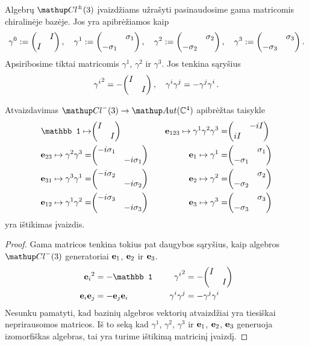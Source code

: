 Algebrų $\Clpm$ įvaizdžiams užrašyti pasinaudosime
gama matricomis chiralinėje bazėje. Jos yra apibrėžiamos kaip
\begin{equation}
	\gamma^0 := \mqty(\admat{I,I}) 			\,,\quad
	\gamma^1 := \mqty(\admat{\sigma_1,-\sigma_1})	\,,\quad
	\gamma^2 := \mqty(\admat{\sigma_2,-\sigma_2})	\,,\quad
	\gamma^3 := \mqty(\admat{\sigma_3,-\sigma_3})	\,.
\end{equation}
Apsiribosime tiktai matricomis $\gamma^1$, $\gamma^2$ ir $\gamma^3$.
Jos tenkina sąryšius
\begin{equation}
		{\gamma^i}^2 = -\mqty(\dmat{I,I})
		\,,\quad
		\gamma^i \gamma^j = - \gamma^j \gamma^i
		\,.
\end{equation}


\begin{proposition}
	Atvaizdavimas $\Clm \to \mathup Aut(\set C^4)$ apibrėžtas taisykle
	\begin{equation}
		\begin{aligned}
			\mathbb 1	\mapsto						&\mqty(\dmat{I,I})						&\quad	\vb e_{123}	\mapsto	\gamma^1\gamma^2\gamma^3 =	&\mqty(\admat{-iI,iI})				\\
			\vb e_{23}	\mapsto	\gamma^2 \gamma^3 =	&\mqty(\dmat{-i\sigma_1,-i\sigma_1})	&\quad	\vb e_1 	\mapsto	\gamma^1 =					&\mqty(\admat{\sigma_1,-\sigma_1})	\\
			\vb e_{31}	\mapsto	\gamma^3 \gamma^1 =	&\mqty(\dmat{-i\sigma_2,-i\sigma_2})	&\quad	\vb e_2 	\mapsto	\gamma^2 =					&\mqty(\admat{\sigma_2,-\sigma_2})	\\
			\vb e_{12}	\mapsto	\gamma^1 \gamma^2 =	&\mqty(\dmat{-i\sigma_3,-i\sigma_3})	&\quad	\vb e_3 	\mapsto	\gamma^3 =					&\mqty(\admat{\sigma_3,-\sigma_3})	
		\end{aligned}
	\end{equation}
	yra ištikimas įvaizdis.
\end{proposition}
\begin{proof}
	Gama matricos tenkina tokius pat daugybos sąryšius,
	kaip algebros $\Clm$ generatoriai $\vb e_1$, $\vb e_2$ ir $\vb e_3$.
	\begin{equation}
		\begin{aligned}
			{\vb e_i}^2 &= -\mathbb1			&\quad	{\gamma^i}^2 &= - \mqty(\dmat{I,I})\\
			\vb e_i \vb e_j &= -\vb e_j \vb e_i	&\quad	\gamma^i\gamma^j &= - \gamma^j\gamma^i
		\end{aligned}
	\end{equation}
	Nesunku pamatyti, kad bazinių algebros vektorių atvaizdžiai
	yra tiesiškai neprirausomos matricos.
	Iš to seką kad $\gamma^1$, $\gamma^2$, $\gamma^3$
	ir $\vb e_1$, $\vb e_2$, $\vb e_3$
	generuoja izomorfiškas algebras,
	tai yra turime ištikimą matricinį įvaizdį.
\end{proof}

